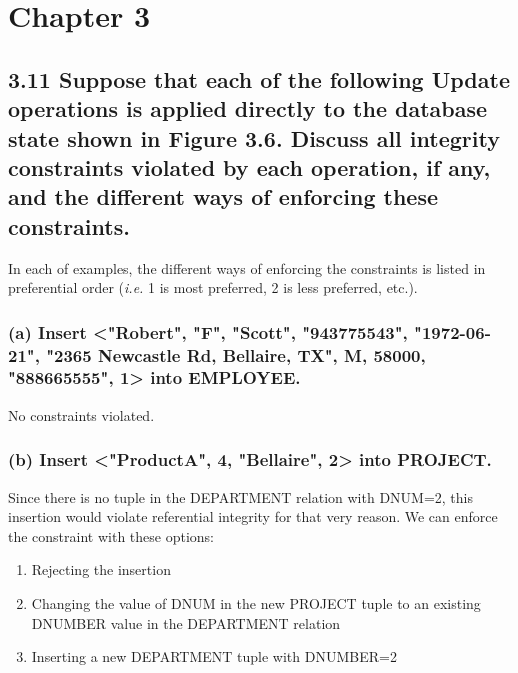 \section*{Chapter 3}
\subsection*{3.11 Suppose that each of the following Update operations is applied directly to the database state shown in Figure 3.6. Discuss all integrity constraints violated by each operation, if any, and the different ways of enforcing these constraints.}

In each of examples, the different ways of enforcing the constraints is listed in preferential order (\textit{i.e.} 1 is most preferred, 2 is less preferred, etc.).

\subsubsection*{(a) Insert <"Robert", "F", "Scott", "943775543", "1972-06-21", "2365 Newcastle Rd, Bellaire, TX", M, 58000, "888665555", 1> into EMPLOYEE.}
No constraints violated.

\subsubsection*{(b) Insert <"ProductA", 4, "Bellaire", 2> into PROJECT.}
 Since there is no tuple in the DEPARTMENT relation with DNUM=2, this insertion would violate referential integrity for that very reason. We can enforce the constraint with these options:
\begin{enumerate}
\item Rejecting the insertion
\item Changing the value of DNUM in the new PROJECT tuple to an existing DNUMBER value in the DEPARTMENT relation
\item Inserting a new DEPARTMENT tuple with DNUMBER=2
\end{enumerate}

